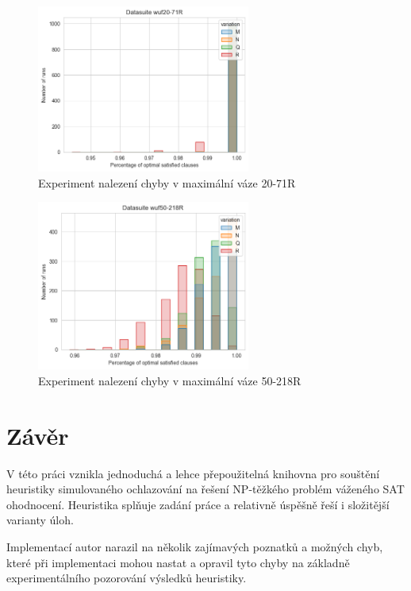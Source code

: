 \documentclass[twoside,twocolumn]{article}
\begin{document}
    \begin{figure}
        \centering
        \includegraphics[width=7cm]{images/testing/bar/sat/wuf20-71R}
        \caption{Experiment nalezení chyby v maximální váze 20-71R}
        \label{fig:bar_sat_71}
    \end{figure}

    \begin{figure}
        \centering
        \includegraphics[width=7cm]{images/testing/bar/sat/wuf50-218R}
        \caption{Experiment nalezení chyby v maximální váze 50-218R}
        \label{fig:bar_sat_218}
    \end{figure}




    \section{Závěr}

    V této práci vznikla jednoduchá a lehce přepoužitelná knihovna pro souštění heuristiky simulovaného ochlazování na řešení
    NP-těžkého problém váženého SAT ohodnocení. Heuristika splňuje zadání práce a relativně úspěšně řeší i složitější varianty úloh.

    Implementací autor narazil na několik zajímavých poznatků a možných chyb, které při implementaci mohou nastat a opravil
    tyto chyby na základně experimentálního pozorování výsledků heuristiky.
\end{document}
